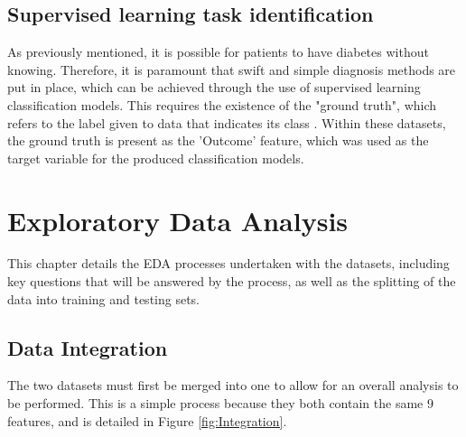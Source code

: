 \documentclass[12pt]{report}
\begin{document}
\section{Supervised learning task identification}
As previously mentioned, it is possible for patients to have diabetes without knowing. Therefore,
it is paramount that swift and simple diagnosis methods are put in place, which can be achieved 
through the use of supervised learning classification models. This requires the existence of the 
"ground truth", which refers to the label given to data that indicates its class \autocite{c3ai_what_nodate}. 
Within these datasets, the ground truth is present as the 'Outcome' feature, which was used 
as the target variable for the produced classification models.




\chapter{Exploratory Data Analysis}
This chapter details the EDA processes undertaken with the datasets, including 
key questions that will be answered by the process, as well as the splitting of the 
data into training and testing %
sets.

\section{Data Integration}
The two datasets must first be merged into one to allow for an overall analysis to be performed.
This is a simple process because they both contain the same 9 features, and is detailed in Figure 
\ref{fig:Integration}.
\end{document}
